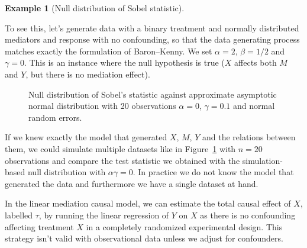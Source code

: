 \documentclass[
  11pt,
  letterpaper,
]{scrbook}
\theoremstyle{definition}
\theoremstyle{definition}
\newtheorem{example}{Example}[chapter]
\theoremstyle{remark}
\begin{document}
\begin{example}[Null distribution of Sobel
statistic]\protect\hypertarget{exm-sobel}{}\label{exm-sobel}

To see this, let's generate data with a binary treatment and normally
distributed mediators and response with no confounding, so that the data
generating process matches exactly the formulation of Baron--Kenny. We
set \(\alpha=2\), \(\beta = 1/2\) and \(\gamma=0\). This is an instance
where the null hypothesis is true (\(X\) affects both \(M\) and \(Y\),
but there is no mediation effect).

\begin{figure}[ht!]


\caption{\label{fig-sobelsimu}Null distribution of Sobel's statistic
against approximate asymptotic normal distribution with 20 observations
\(\alpha=0\), \(\gamma=0.1\) and normal random errors.}

\end{figure}%

If we knew exactly the model that generated \(X\), \(M\), \(Y\) and the
relations between them, we could simulate multiple datasets like in
Figure~\ref{fig-sobelsimu} with \(n=20\) observations and compare the
test statistic we obtained with the simulation-based null distribution
with \(\alpha\gamma=0\). In practice we do not know the model that
generated the data and furthermore we have a single dataset at hand.

\end{example}

In the linear mediation causal model, we can estimate the total causal
effect of \(X\), labelled \(\tau\), by running the linear regression of
\(Y\) on \(X\) as there is no confounding affecting treatment \(X\) in a
completely randomized experimental design. This strategy isn't valid
with observational data unless we adjust for confounders.
\end{document}

